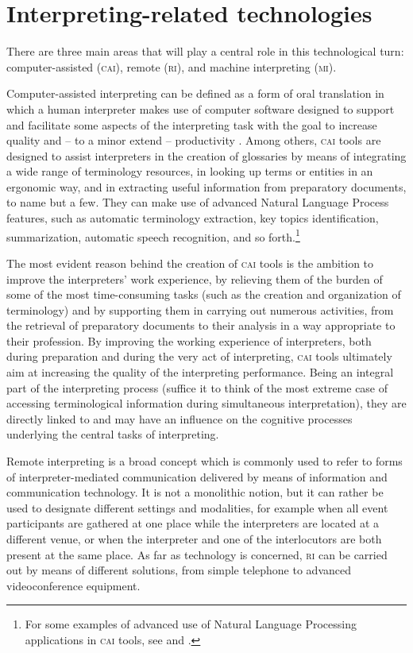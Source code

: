 \documentclass[output=paper]{langsci/langscibook}
\begin{document}
\section{Interpreting-related technologies} 
There are three main areas that will play a central role in this technological turn: computer-assisted (\textsc{cai}), remote (\textsc{ri}), and machine interpreting (\textsc{mi}). 
 
Computer-assisted interpreting can be defined as a form of oral translation in which a human interpreter makes use of computer software designed to support and facilitate some aspects of the interpreting task with the goal to increase quality and -- to a minor extend -- productivity \citep{Fantinuoli2018}. Among others, \textsc{cai} tools are designed to assist interpreters in the creation of glossaries by means of integrating a wide range of terminology resources, in looking up terms or entities in an ergonomic way, and in extracting useful information from preparatory documents, to name but a few. They can make use of advanced Natural Language Process features, such as automatic terminology extraction, key topics identification, summarization, automatic speech recognition, and so forth.\footnote{For some examples of advanced use of Natural Language Processing applications in \textsc{cai} tools, see 
\citet{Fantinuoli2017b}
and \citet{stewart_automatic_2018}.} 
 
The most evident reason behind the creation of \textsc{cai} tools is the ambition to improve the interpreters’ work experience, by relieving them of the burden of some of the most time-consuming tasks (such as the creation and organization of terminology) and by supporting them in carrying out numerous activities, from the retrieval of preparatory documents to their analysis in a way appropriate to their profession. By improving the working experience of interpreters, both during preparation and during the very act of interpreting, \textsc{cai} tools ultimately aim at increasing the quality of the interpreting performance. Being an integral part of the interpreting process (suffice it to think of the most extreme case of accessing terminological information during simultaneous interpretation), they are directly linked to and may have an influence on the cognitive processes underlying the central tasks of interpreting.   
 
Remote interpreting is a broad concept which is commonly used to refer to forms of interpreter-mediated communication delivered by means of information and communication technology. It is not a monolithic notion, but it can rather be used to designate different settings and modalities, for example when all event participants are gathered at one place while the interpreters are located at a different venue, or when the interpreter and one of the interlocutors are both present at the same place. As far as technology is concerned, \textsc{ri} can be carried out by means of different solutions, from simple telephone to advanced videoconference equipment. 
 
\end{document}
